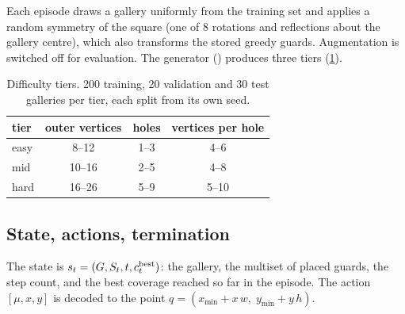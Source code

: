 \documentclass[11pt,a4paper]{article}
\begin{document}
Each episode draws a gallery uniformly from the training set and applies a random symmetry
of the square (one of 8 rotations and reflections about the gallery centre), which also
transforms the stored greedy guards. Augmentation is switched off for evaluation. The
generator () produces three tiers (\cref{tab:tiers}).

\begin{table}[!htbp]
\centering\small
\caption{Difficulty tiers. 200 training, 20 validation and 30 test galleries per tier, each
split from its own seed.}
\label{tab:tiers}
\begin{tabular}{lccc}
\toprule
tier & outer vertices & holes & vertices per hole \\
\midrule
easy & 8--12  & 1--3 & 4--6 \\
mid  & 10--16 & 2--5 & 4--8 \\
hard & 16--26 & 5--9 & 5--10 \\
\bottomrule
\end{tabular}
\end{table}

\subsection{State, actions, termination}

The state is $s_t = (G, S_t, t, c^{\mathrm{best}}_t)$: the gallery, the multiset of
placed guards, the step count, and the best coverage reached so far in the episode. The action
$[\mu, x, y]$ is decoded to the point $q = (x_{\min} + x\,w,\; y_{\min} + y\,h)$.
\end{document}
